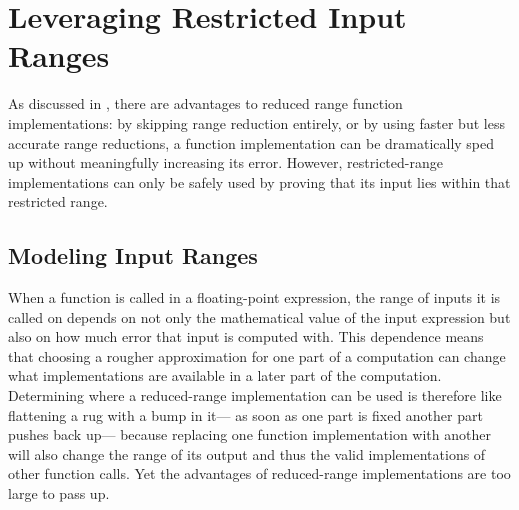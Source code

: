 \documentclass[paper.tex]{subfiles}
\begin{document}
\section{Leveraging Restricted Input Ranges}
\label{sec:ranges}

As discussed in ,
  there are advantages to reduced range function implementations:
  by skipping range reduction entirely,
  or by using faster but less accurate range reductions,
  a function implementation can be dramatically sped up
  without meaningfully increasing its error.
However, restricted-range implementations can only be safely used
  by proving that its input lies within that restricted range.

\subsection{Modeling Input Ranges}

When a function is called in a floating-point expression,
  the range of inputs it is called on
  depends on not only the mathematical value of the input expression
  but also on how much error that input is computed with.
This dependence means that
  choosing a rougher approximation for one part of a computation
  can change what implementations are available in a later part of the computation.
Determining where a reduced-range implementation can be used
  is therefore like flattening a rug with a bump in it---%
  as soon as one part is fixed another part pushes back up---%
  because replacing one function implementation with another
  will also change the range of its output
  and thus the valid implementations of other function calls.
Yet the advantages of reduced-range implementations
  are too large to pass up.
\end{document}
